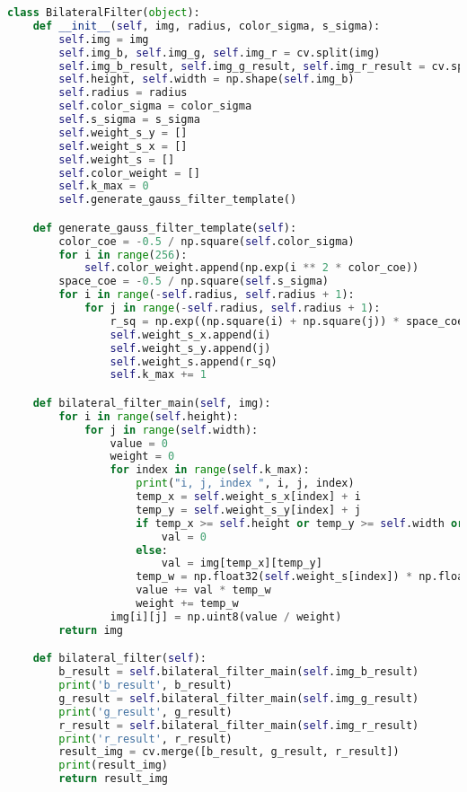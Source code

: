 \documentclass{hitreport}
\begin{document}
\begin{appendices}
\begin{lstlisting}[language=python]
class BilateralFilter(object):
    def __init__(self, img, radius, color_sigma, s_sigma):
        self.img = img
        self.img_b, self.img_g, self.img_r = cv.split(img)
        self.img_b_result, self.img_g_result, self.img_r_result = cv.split(img)
        self.height, self.width = np.shape(self.img_b)
        self.radius = radius
        self.color_sigma = color_sigma
        self.s_sigma = s_sigma
        self.weight_s_y = []
        self.weight_s_x = []
        self.weight_s = []
        self.color_weight = []
        self.k_max = 0
        self.generate_gauss_filter_template()

    def generate_gauss_filter_template(self):
        color_coe = -0.5 / np.square(self.color_sigma)
        for i in range(256):
            self.color_weight.append(np.exp(i ** 2 * color_coe))
        space_coe = -0.5 / np.square(self.s_sigma)
        for i in range(-self.radius, self.radius + 1):
            for j in range(-self.radius, self.radius + 1):
                r_sq = np.exp((np.square(i) + np.square(j)) * space_coe)
                self.weight_s_x.append(i)
                self.weight_s_y.append(j)
                self.weight_s.append(r_sq)
                self.k_max += 1

    def bilateral_filter_main(self, img):
        for i in range(self.height):
            for j in range(self.width):
                value = 0
                weight = 0
                for index in range(self.k_max):
                    print("i, j, index ", i, j, index)
                    temp_x = self.weight_s_x[index] + i
                    temp_y = self.weight_s_y[index] + j
                    if temp_x >= self.height or temp_y >= self.width or temp_x < 0 or temp_y < 0:
                        val = 0
                    else:
                        val = img[temp_x][temp_y]
                    temp_w = np.float32(self.weight_s[index]) * np.float32(self.color_weight[np.abs(val - img[i][j])])
                    value += val * temp_w
                    weight += temp_w
                img[i][j] = np.uint8(value / weight)
        return img

    def bilateral_filter(self):
        b_result = self.bilateral_filter_main(self.img_b_result)
        print('b_result', b_result)
        g_result = self.bilateral_filter_main(self.img_g_result)
        print('g_result', g_result)
        r_result = self.bilateral_filter_main(self.img_r_result)
        print('r_result', r_result)
        result_img = cv.merge([b_result, g_result, r_result])
        print(result_img)
        return result_img



\end{lstlisting}
\end{appendices}
\end{document}
